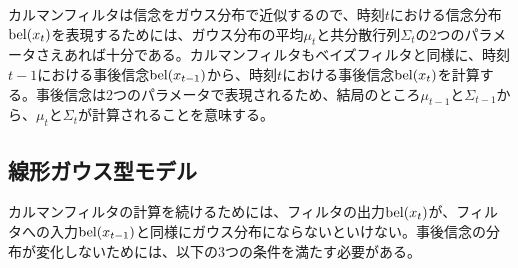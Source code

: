\documentclass[dvipdfmx,a4paper]{jsarticle}
\begin{document}
カルマンフィルタは信念をガウス分布で近似するので、時刻$t$における信念分布$\operatorname{bel}(x_t)$を表現するためには、ガウス分布の平均$\mu_t$と共分散行列$\Sigma_t$の2つのパラメータさえあれば十分である。カルマンフィルタもベイズフィルタと同様に、時刻$t - 1$における事後信念$\operatorname{bel}(x_{t - 1})$から、時刻$t$における事後信念$\operatorname{bel}(x_t)$を計算する。事後信念は2つのパラメータで表現されるため、結局のところ$\mu_{t - 1}$と$\Sigma_{t - 1}$から、$\mu_t$と$\Sigma_t$が計算されることを意味する。

\subsection{線形ガウス型モデル}
カルマンフィルタの計算を続けるためには、フィルタの出力$\operatorname{bel}(x_t)$が、フィルタへの入力$\operatorname{bel}(x_{t - 1})$と同様にガウス分布にならないといけない。事後信念の分布が変化しないためには、以下の3つの条件を満たす必要がある。\newline
\end{document}
